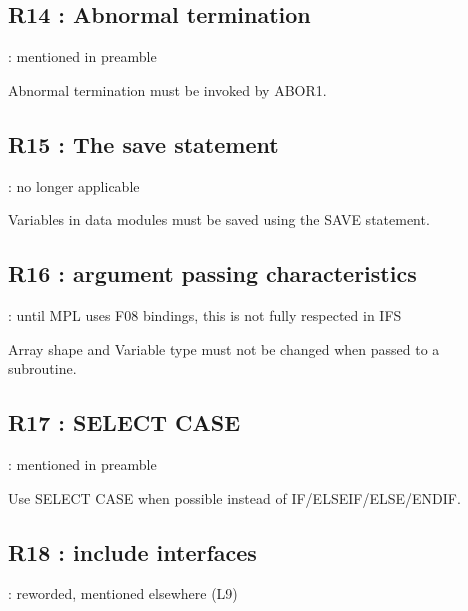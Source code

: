 \documentclass[letterpaper,10pt,english]{sphinxmanual}
\begin{document}
\sphinxstepscope


\subsection{R14 :  Abnormal termination}
\label{\detokenize{obsolescent/r14:r14-abnormal-termination}}\label{\detokenize{obsolescent/r14::doc}}
\sphinxAtStartPar
{} : mentioned in preamble

\sphinxAtStartPar
Abnormal termination must be invoked by ABOR1.

\sphinxstepscope


\subsection{R15 :  The save statement}
\label{\detokenize{obsolescent/r15:r15-the-save-statement}}\label{\detokenize{obsolescent/r15::doc}}
\sphinxAtStartPar
{} : no longer applicable

\sphinxAtStartPar
Variables in data modules must be saved using the SAVE statement.

\sphinxstepscope


\subsection{R16 : argument passing characteristics}
\label{\detokenize{obsolescent/r16:r16-argument-passing-characteristics}}\label{\detokenize{obsolescent/r16::doc}}
\sphinxAtStartPar
{} : until MPL uses F08 bindings, this is not fully respected in IFS

\sphinxAtStartPar
Array shape and Variable type must not be changed when passed to a subroutine.

\sphinxstepscope


\subsection{R17 :  SELECT CASE}
\label{\detokenize{obsolescent/r17:r17-select-case}}\label{\detokenize{obsolescent/r17::doc}}
\sphinxAtStartPar
{} : mentioned in preamble

\sphinxAtStartPar
Use SELECT CASE when possible instead of IF/ELSEIF/ELSE/ENDIF.

\sphinxstepscope


\subsection{R18 : include interfaces}
\label{\detokenize{obsolescent/r18:r18-include-interfaces}}\label{\detokenize{obsolescent/r18::doc}}
\sphinxAtStartPar
{} : reworded, mentioned elsewhere (L9)
\end{document}
